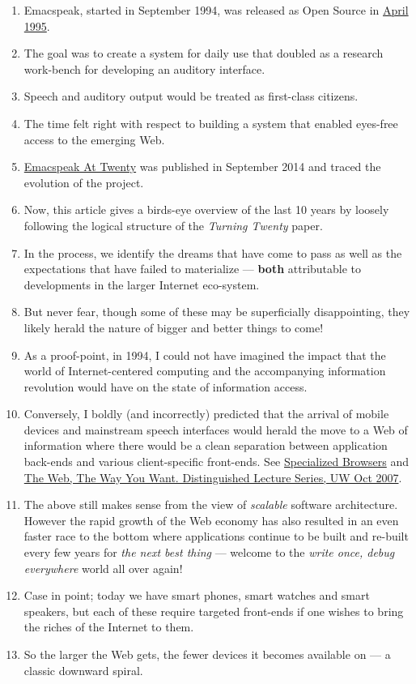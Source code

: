 \documentclass[11pt]{article}
\begin{document}
\begin{enumerate}
\item Emacspeak, started in September 1994, was released as Open
Source in \href{https://tvraman.github.io/emacspeak//web/releases/release-3.0.html}{April 1995}.
\item The goal was to create a system for daily use that  doubled
as a research work-bench for developing an auditory interface.
\item Speech and auditory output would be  treated as 
first-class citizens.
\item The time felt right with respect to building a  system 
that enabled  eyes-free access to the emerging Web.
\item \href{https://emacspeak.sourceforge.net/turning-twenty.html}{Emacspeak At Twenty}  was published in September 2014 and  traced the
evolution of the project.
\item Now, this article gives a birds-eye overview of the last 10 years
by loosely following the logical structure of the  \emph{Turning Twenty} paper.
\item In the process, we identify the dreams that have come to pass as
well as the expectations that have failed to materialize --- \textbf{both}
attributable  to developments in the larger Internet eco-system.
\item But never fear, though  some of these
may be   superficially
disappointing, they likely herald the nature of bigger and better
things to come!
\item As a proof-point, in 1994, I could not have imagined the impact
that the world of Internet-centered  computing and the accompanying
information revolution would have  on the state of information
access.
\item Conversely, I boldly (and incorrectly) predicted that the
arrival of mobile devices and mainstream speech interfaces would
herald the move to a Web of information where there would be a
clean separation between application back-ends and various
client-specific front-ends. See \href{https://emacspeak.sourceforge.net/raman/publications/specialized-browsers/}{Specialized Browsers} and \href{http://www.cs.washington.edu/htbin-post/mvis/mvis?ID=636}{The
Web, The Way You Want.  Distinguished Lecture Series, UW Oct 2007}.
\item The above still makes sense from the view of  \emph{scalable} software architecture. However the rapid growth of the Web economy has also
resulted in an even faster race to the bottom where applications
continue to be built and re-built every few years for \emph{the next
best thing} --- welcome to the \emph{write once, debug everywhere}
world all over again!
\item Case in point; today we have smart phones, smart watches  and smart speakers,
but each of these  require targeted front-ends  
if one wishes to  bring the riches of the Internet to them.
\item So the larger the Web gets, the fewer devices it becomes
available  on --- a classic downward spiral.
\end{enumerate}
\end{document}

